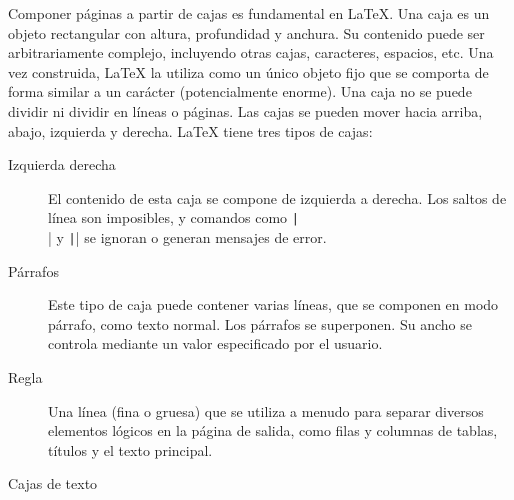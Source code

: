 \begin{frame}
	Componer páginas a partir de cajas es fundamental en \LaTeX.
	Una caja es un objeto rectangular con altura, profundidad y
	anchura.
	Su contenido puede ser arbitrariamente complejo, incluyendo otras
	cajas, caracteres, espacios, etc.
	Una vez construida, \LaTeX{} la utiliza como un único objeto fijo
	que se comporta de forma similar a un carácter (potencialmente
	enorme).
	Una caja no se puede dividir ni dividir en líneas o páginas.
	Las cajas se pueden mover hacia arriba, abajo, izquierda y derecha.
	\LaTeX{} tiene tres tipos de cajas:

	\begin{description}
		\item[Izquierda derecha]

		      El contenido de esta caja se compone de izquierda a
					derecha.
		      Los saltos de línea son imposibles, y comandos como
		      \texttt|\\| y \texttt|\newline| se
		      ignoran o generan mensajes de error.

		\item[Párrafos]

		      Este tipo de caja puede contener varias líneas, que se
		      componen en modo párrafo, como texto normal.
		      Los párrafos se superponen.
		      Su ancho se controla mediante un valor especificado por
		      el usuario.

		\item[Regla]

		      Una línea (fina o gruesa) que se utiliza a menudo para
		      separar diversos elementos lógicos en la página de salida,
		      como filas y columnas de tablas, títulos y el texto
		      principal.
	\end{description}

	\begin{block}{Cajas de texto}\end{block} %
\end{frame}
